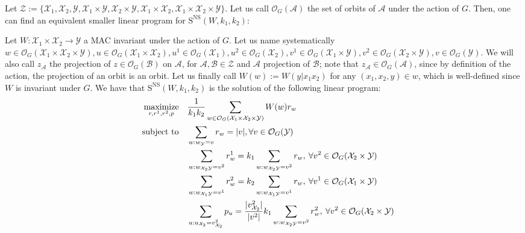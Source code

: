 Let $\mathcal{Z} := \{\mathcal{X}_1, \mathcal{X}_2, \mathcal{Y}, \mathcal{X}_1 \times \mathcal{Y}, \mathcal{X}_2 \times \mathcal{Y}, \mathcal{X}_1 \times \mathcal{X}_2,  \mathcal{X}_1 \times \mathcal{X}_2 \times \mathcal{Y} \}$. Let us call $\mathcal{O}_G(\mathcal{A})$ the set of orbits of $\mathcal{A}$ under the action of $G$. Then, one can find an equivalent smaller linear program for $\mathrm{S}^{\mathrm{NS}}(W,k_1,k_2)$:
\begin{theorem}
  \label{theo:polyLP}
  Let $W : \mathcal{X}_1 \times \mathcal{X}_2 \rightarrow \mathcal{Y}$ a MAC invariant under the action of $G$. Let us name systematically $w \in \mathcal{O}_G(\mathcal{X}_1 \times \mathcal{X}_2 \times \mathcal{Y}), u \in \mathcal{O}_G(\mathcal{X}_1 \times \mathcal{X}_2), u^1 \in \mathcal{O}_G(\mathcal{X}_1), u^2 \in \mathcal{O}_G(\mathcal{X}_2), v^1 \in \mathcal{O}_G(\mathcal{X}_1 \times \mathcal{Y}), v^2 \in \mathcal{O}_G(\mathcal{X}_2 \times \mathcal{Y}), v \in \mathcal{O}_G(\mathcal{Y})$. We will also call $z_{\mathcal{A}}$ the projection of $z \in \mathcal{O}_G(\mathcal{B})$ on $\mathcal{A}$, for $\mathcal{A},\mathcal{B} \in \mathcal{Z}$ and $\mathcal{A}$ projection of $\mathcal{B}$; note that $z_{\mathcal{A}} \in \mathcal{O}_G(\mathcal{A})$, since by definition of the action, the projection of an orbit is an orbit. Let us finally call $W(w) := W(y|x_1x_2)$ for any $(x_1,x_2,y) \in w$, which is well-defined since $W$ is invariant under $G$.
  We have that $\mathrm{S}^{\mathrm{NS}}(W,k_1,k_2)$ is the solution of the following linear program:
  \begin{equation}
  \begin{aligned}
    &&\underset{r,r^1,r^2,p}{\maxi} &&& \frac{1}{k_1k_2}\sum_{w \in \mathcal{O}_G(\mathcal{X}_1 \times \mathcal{X}_2 \times \mathcal{Y})} W(w)r_w\\
    &&\st &&& \sum_{w:w_{\mathcal{Y}}=v} r_w = |v|, \forall v \in \mathcal{O}_G(\mathcal{Y})\\
    &&&&& \sum_{w:w_{\mathcal{X}_2\mathcal{Y}}=v^2} r^1_{w} = k_1 \sum_{w:w_{\mathcal{X}_2\mathcal{Y}}=v^2} r_w, \: \forall v^2 \in \mathcal{O}_G(\mathcal{X}_2 \times \mathcal{Y})\\
    &&&&& \sum_{w:w_{\mathcal{X}_1\mathcal{Y}}=v^1} r^2_{w} = k_2 \sum_{w:w_{\mathcal{X}_1\mathcal{Y}}=v^1} r_w, \: \forall v^1 \in \mathcal{O}_G(\mathcal{X}_1 \times \mathcal{Y})\\
    &&&&& \sum_{u:u_{\mathcal{X}_2}=v^2_{\mathcal{X}_2}} p_u = \frac{|v^2_{\mathcal{X}_2}|}{|v^2|} k_1 \sum_{w:w_{\mathcal{X}_2\mathcal{Y}}=v^2} r^2_w, \: \forall v^2 \in \mathcal{O}_G(\mathcal{X}_2 \times \mathcal{Y})\\

\end{aligned}
\end{equation}
\end{theorem}
